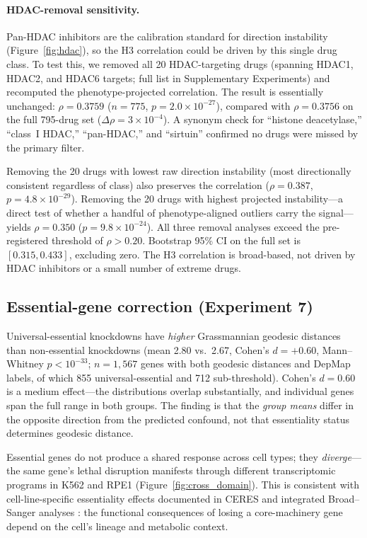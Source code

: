 \documentclass[11pt]{article}
\begin{document}
\paragraph{HDAC-removal sensitivity.}
Pan-HDAC inhibitors are the calibration standard for direction instability
(Figure~\ref{fig:hdac}), so the H3 correlation could be driven by this
single drug class. To test this, we removed all 20 HDAC-targeting drugs
(spanning HDAC1, HDAC2, and HDAC6 targets; full list in Supplementary Experiments)
and recomputed the phenotype-projected correlation. The result is
essentially unchanged: $\rho = 0.3759$ ($n = 775$,
$p = 2.0 \times 10^{-27}$), compared with $\rho = 0.3756$ on the full
795-drug set ($\Delta\rho = 3 \times 10^{-4}$). A synonym check for ``histone
deacetylase,'' ``class~I HDAC,'' ``pan-HDAC,'' and ``sirtuin'' confirmed
no drugs were missed by the primary filter.

Removing the 20 drugs with lowest raw direction instability (most directionally
consistent regardless of class) also preserves the correlation
($\rho = 0.387$, $p = 4.8 \times 10^{-29}$). Removing the 20 drugs with
highest projected instability---a direct test of whether a handful of
phenotype-aligned outliers carry the signal---yields $\rho = 0.350$
($p = 9.8 \times 10^{-24}$). All three removal analyses exceed the
pre-registered threshold of $\rho > 0.20$. Bootstrap 95\% CI on the full
set is $[0.315, 0.433]$, excluding zero. The H3 correlation is broad-based,
not driven by HDAC inhibitors or a small number of extreme drugs.

\subsection{Essential-gene correction (Experiment 7)}

Universal-essential knockdowns have \emph{higher} Grassmannian geodesic
distances than non-essential knockdowns (mean 2.80 vs.\ 2.67, Cohen's $d =
+0.60$, Mann--Whitney $p < 10^{-33}$; $n = 1{,}567$ genes with both
geodesic distances and DepMap labels, of which 855 universal-essential and
712 sub-threshold). Cohen's $d = 0.60$ is a medium effect---the
distributions overlap substantially, and individual genes span the full
range in both groups. The finding is that the \emph{group means} differ
in the opposite direction from the predicted confound, not that essentiality
status determines geodesic distance.

Essential genes do not produce a shared response across cell types; they
\emph{diverge}---the same gene's lethal disruption manifests through
different transcriptomic programs in K562 and RPE1
(Figure~\ref{fig:cross_domain}). This is consistent with cell-line-specific
essentiality effects documented in CERES \citep{meyers2017ceres} and
integrated Broad--Sanger analyses \citep{pacini2021integrated}: the
functional consequences of losing a core-machinery gene depend on
the cell's lineage and metabolic context.
\end{document}
